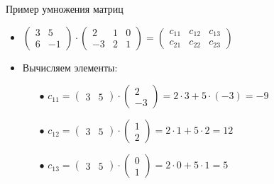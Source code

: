 \documentclass[unicode,11pt,notheorems]{beamer}
\begin{document}
\begin{frame}[allowframebreaks]{Пример умножения матриц}{}
\begin{itemize}
	\item 
		$\begin{pmatrix}3&5\\6&-1\end{pmatrix} \cdot \begin{pmatrix}2&1 & 0\\-3&2 & 1\end{pmatrix}
		= \begin{pmatrix}c_{11}& c_{12} & c_{13}\\ c_{21} &c_{22} & c_{23}\end{pmatrix}$
	\framebreak
	\item Вычисляем элементы:
		\begin{itemize}
		\item[$\bullet$]
			 $c_{11} =  \begin{pmatrix}3 & 5 \end{pmatrix} \cdot \begin{pmatrix}2\\-3\end{pmatrix} = 2\cdot 3+5\cdot(-3)=-9$
		\item[$\bullet$] 
			 $c_{12} =  \begin{pmatrix}3 & 5 \end{pmatrix} \cdot \begin{pmatrix}1\\2\end{pmatrix} = 2\cdot 1+5\cdot 2=12$
		\item[$\bullet$]
			 $c_{13} =  \begin{pmatrix}3 & 5 \end{pmatrix} \cdot \begin{pmatrix}0\\1\end{pmatrix} = 2\cdot 0+5\cdot 1=5$


\end{itemize}
\end{itemize}
\end{frame}
\end{document}
